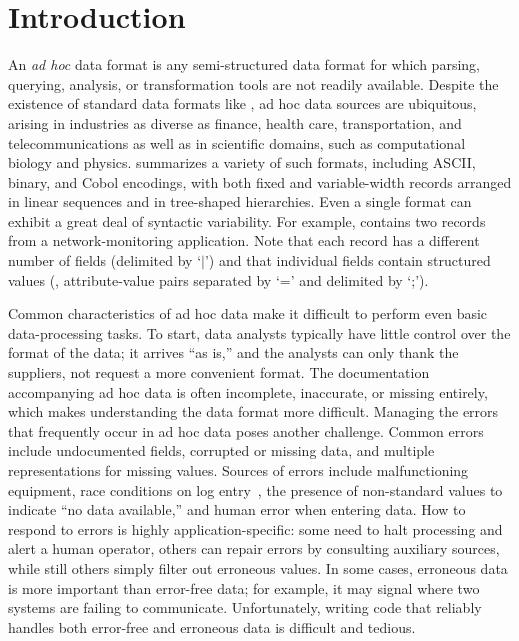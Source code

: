 \section{Introduction}
\label{sec:intro}

An {\em ad hoc} data format is any semi-structured data format for which
parsing, querying, analysis, or transformation tools are not readily
available.  Despite the existence of standard
data formats like \xml{}, ad hoc data sources are ubiquitous,
arising in industries as diverse as finance, health care,
transportation, and telecommunications as well as in scientific
domains, such as computational biology and physics.
 summarizes a variety of such formats,
including ASCII, binary, and Cobol encodings, with both fixed and
variable-width records arranged in linear sequences and in tree-shaped
hierarchies.  Even a single format can exhibit a great deal of
syntactic variability.  For example, 
contains two records from a network-monitoring application.  Note that
each record has a different number of fields (delimited by `$|$') and
that individual fields contain structured values (\eg{},
attribute-value pairs separated by `=' and delimited by `;').

Common characteristics of ad hoc data make it difficult to perform
even basic data-processing tasks.  To start, data analysts typically
have little control over the format of the data;  it
arrives ``as is,'' and the analysts can only thank the suppliers,
not request a more convenient format.  The documentation accompanying
ad hoc data is often incomplete, inaccurate, or missing entirely,
which makes understanding the data format more difficult.
Managing the errors that frequently occur in ad hoc data poses another challenge. Common errors include undocumented fields, corrupted or missing data, and multiple representations for missing values.  Sources of errors include
malfunctioning equipment, race conditions on log entry~\cite{wpp}, the
presence of non-standard values to indicate ``no data available,'' and
human error when entering data.  How to respond to errors is highly 
application-specific: some need to halt processing and
alert a human operator, others can repair errors by consulting auxiliary sources, while still others simply filter out erroneous values. In some cases, erroneous data is more important than error-free data; for example, 
it may signal where two systems are failing to communicate.
Unfortunately, writing code that reliably handles
both error-free and erroneous data is difficult and tedious.


